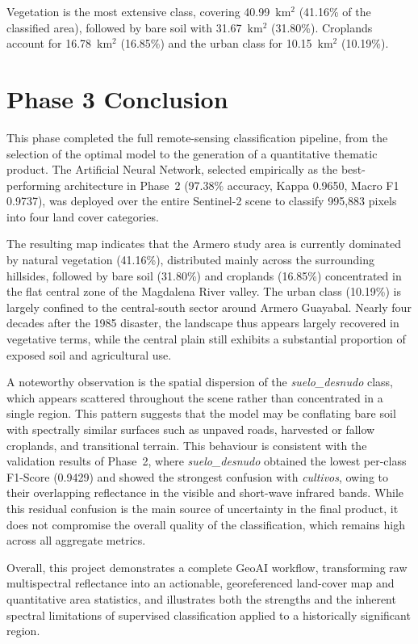 \documentclass[12pt,a4paper]{article}
\begin{document}
Vegetation is the most extensive class, covering 40.99~km$^2$ (41.16\% of the classified area), followed by bare soil with 31.67~km$^2$ (31.80\%). Croplands account for 16.78~km$^2$ (16.85\%) and the urban class for 10.15~km$^2$ (10.19\%).

\section{Phase 3 Conclusion}

This phase completed the full remote-sensing classification pipeline, from the selection of the optimal model to the generation of a quantitative thematic product. The Artificial Neural Network, selected empirically as the best-performing architecture in Phase~2 (97.38\% accuracy, Kappa 0.9650, Macro F1 0.9737), was deployed over the entire Sentinel-2 scene to classify 995,883 pixels into four land cover categories.

The resulting map indicates that the Armero study area is currently dominated by natural vegetation (41.16\%), distributed mainly across the surrounding hillsides, followed by bare soil (31.80\%) and croplands (16.85\%) concentrated in the flat central zone of the Magdalena River valley. The urban class (10.19\%) is largely confined to the central-south sector around Armero Guayabal. Nearly four decades after the 1985 disaster, the landscape thus appears largely recovered in vegetative terms, while the central plain still exhibits a substantial proportion of exposed soil and agricultural use.

A noteworthy observation is the spatial dispersion of the \textit{suelo\_desnudo} class, which appears scattered throughout the scene rather than concentrated in a single region. This pattern suggests that the model may be conflating bare soil with spectrally similar surfaces such as unpaved roads, harvested or fallow croplands, and transitional terrain. This behaviour is consistent with the validation results of Phase~2, where \textit{suelo\_desnudo} obtained the lowest per-class F1-Score (0.9429) and showed the strongest confusion with \textit{cultivos}, owing to their overlapping reflectance in the visible and short-wave infrared bands. While this residual confusion is the main source of uncertainty in the final product, it does not compromise the overall quality of the classification, which remains high across all aggregate metrics.

Overall, this project demonstrates a complete GeoAI workflow, transforming raw multispectral reflectance into an actionable, georeferenced land-cover map and quantitative area statistics, and illustrates both the strengths and the inherent spectral limitations of supervised classification applied to a historically significant region.
\end{document}
